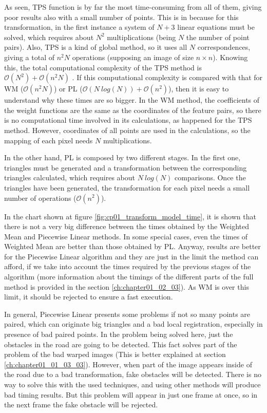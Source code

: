 As seen, \ac{TPS} function is by far the most time-consuming from all of them, giving poor results also with a small number of points. This is in because for this transformation, in the first instance a system of $N + 3$ linear equations must be solved, which requires about $N^2$ multiplications (being $N$ the number of point pairs). Also, TPS is a kind of global method, so it uses all $N$ correspondences, giving a total of $n^2N$ operations (supposing an image of size $n \times n$). Knowing this, the total computational complexity of the TPS method is $\mathcal{O}(N^2) + \mathcal{O}(n^2N)$ \citep{zagorchev2006comparative}. If this computational complexity is compared with that for \ac{WM} ($\mathcal{O}(n^2N)$) or \ac{PL} ($\mathcal{O}(N~log(N)) + \mathcal{O}(n^2)$), then it is easy to understand why these times are so bigger. In the \acf{WM} method, the coefficients of the weight functions are the same as the coordinates of the feature pairs, so there is no computational time involved in its calculations, as happened for the \ac{TPS} method. However, coordinates of all points are used in the calculations, so the mapping of each pixel needs $N$ multiplications.

In the other hand, \acf{PL} is composed by two different stages. In the first one, triangles must be generated and a transformation between the corresponding triangles calculated, which requires about $N~log(N)$ comparisons. Once the triangles have been generated, the transformation for each pixel needs a small number of operations ($\mathcal{O}(n^2)$).

In the chart shown at figure \ref{fig:cp01_transform_model_time}, it is shown that there is not a very big difference between the times obtained by the Weighted Mean and Piecewise Linear methods. In some special cases, even the times of Weighted Mean are better than those obtained by \ac{PL}. Anyway, results are better for the Piecewise Linear algorithm and they are just in the limit the method can afford, if we take into account the times required by the previous stages of the algorithm (more information about the timings of the different parts of the full method is provided in the section \ref{ch:chapter01_02_03}). As \ac{WM} is over this limit, it should be rejected to ensure a fast execution.

In general, Piecewise Linear presents some problems if not so many points are paired, which can originate big triangles and a bad local registration, especially in presence of bad paired points. In the problem being solved here, just the obstacles in the road are going to be detected. This fact solves part of the problem of the bad warped images (This is better explained at section \ref{ch:chapter01_01_03_03}). However, when part of the image appears inside of the road due to a bad transformation, fake obstacles will be detected. There is no way to solve this with the used techniques, and using other methods will produce bad timing results. But this problem will appear in just one frame at once, so in the next frame the fake obstacle will be rejected.

